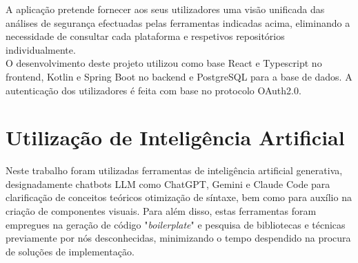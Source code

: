 \documentclass[a4paper,openright,twoside,11pt]{report}
\begin{document}
A aplicação pretende fornecer aos seus utilizadores uma visão unificada das análises de segurança efectuadas pelas ferramentas indicadas acima, eliminando a necessidade de consultar cada plataforma e respetivos repositórios individualmente. \\

O desenvolvimento deste projeto utilizou como base React e Typescript no frontend, Kotlin e Spring Boot no backend e PostgreSQL para a base de dados. A autenticação dos utilizadores é feita com base no protocolo OAuth2.0.




\cleardoublepage
\chapter*{Utilização de Inteligência Artificial}
Neste trabalho foram utilizadas ferramentas de inteligência artificial generativa, designadamente chatbots LLM como ChatGPT, Gemini e Claude Code para clarificação de conceitos teóricos otimização de síntaxe, bem como para auxílio na criação de componentes visuais. Para além disso, estas ferramentas foram empregues na geração de código "\textit{boilerplate}" e pesquisa de bibliotecas e técnicas previamente por nós desconhecidas, minimizando o tempo despendido na procura de soluções de implementação.\\

\cleardoublepage
\tableofcontents \cleardoublepage


\setcounter{page}{1}









%








\appendix

\end{document}
